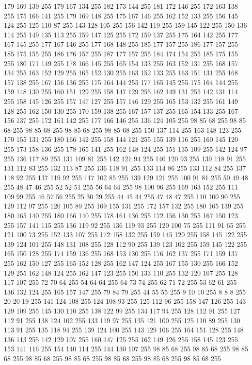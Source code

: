 179 169 139 255 179 167 134 255 182 173 144 255 181 172 146 255 172 163 138 255 175 166 141 255 179 169 148 255 175 167 146 255 162 152 133 255 156 145 124 255 125 110 87 255 143 128 105 255 156 142 119 255 159 145 122 255 150 136 114 255 149 135 113 255 159 147 125 255 172 159 137 255 175 164 142 255 177 167 145 255 177 167 146 255 177 168 148 255 185 177 157 255 186 177 157 255 185 175 155 255 186 176 157 255 187 177 157 255 184 174 154 255 185 175 155 255 180 171 149 255 178 166 145 255 165 154 133 255 163 152 131 255 168 157 134 255 163 152 129 255 165 152 130 255 163 152 133 255 163 151 131 255 168 157 138 255 167 156 136 255 175 164 144 255 177 165 145 255 175 164 144 255 159 148 130 255 160 151 129 255 158 147 129 255 162 149 131 255 142 131 114 255 158 145 126 255 157 147 127 255 157 146 129 255 165 153 132 255 161 149 128 255 162 150 130 255 170 159 138 255 167 157 137 255 165 154 133 255 167 156 137 255 172 161 142 255 177 166 146 255 136 124 105 255 98 85 68 255 98 85 68 255 98 85 68 255
98 85 68 255 98 85 68 255 150 137 114 255 163 148 123 255 170 155 131 255 180 166 142 255 158 144 121 255 155 139 116 255 160 145 120 255 173 158 136 255 178 165 141 255 162 148 124 255 151 135 109 255 142 124 97 255 136 117 89 255 131 109 81 255 142 121 94 255 140 120 93 255 139 118 91 255 131 112 83 255 132 113 87 255 136 118 91 255 133 114 86 255 133 112 84 255 137 118 92 255 137 119 92 255 117 102 85 255 139 129 121 255 100 91 81 255 50 49 48 255 48 47 46 255 52 52 51 255 56 64 64 255 98 100 96 255 169 163 152 255 111 109 99 255 46 57 56 255 25 30 29 255 44 45 44 255 47 48 47 255 110 100 90 255 129 112 97 255 120 105 89 255 169 155 131 255 172 157 132 255 180 165 139 255 180 165 140 255 180 166 140 255 178 161 136 255 172 156 130 255 167 150 123 255 157 141 115 255 136 119 92 255 136 119 93 255 120 100 75 255 111 91 65 255 121 100 73 255 152 133 107 255 172 158 132 255 159 145 120 255 158 145 122 255 139 124 101 255 148 131 108 255 128 112 90 255
139 123 102 255 159 145 122 255 165 150 128 255 174 159 136 255 168 153 130 255 176 162 137 255 171 159 137 255 162 150 127 255 165 152 128 255 162 147 124 255 167 155 130 255 166 152 129 255 162 148 124 255 162 147 123 255 150 133 110 255 132 120 107 255 128 117 107 255 72 70 64 255 54 64 64 255 64 73 74 255 62 71 72 255 53 62 61 255 136 132 124 255 165 157 147 255 79 84 79 255 44 55 55 255 9 10 10 255 8 8 8 255 20 20 19 255 141 124 108 255 124 108 93 255 125 112 96 255 158 147 126 255 143 129 109 255 145 130 110 255 138 122 99 255 134 117 94 255 128 112 91 255 127 112 91 255 138 124 102 255 133 119 97 255 135 121 100 255 125 110 89 255 130 113 91 255 135 118 94 255 139 124 100 255 143 129 106 255 164 151 128 255 148 136 113 255 142 129 107 255 160 147 125 255 162 149 126 255 158 145 123 255 153 141 116 255 154 140 114 255 144 130 107 255 98 85 68 255 98 85 68 255 98 85 68 255 98 85 68 255 98 85 68 255 98 85 68 255 98 85 68 255 98 85 68 255
